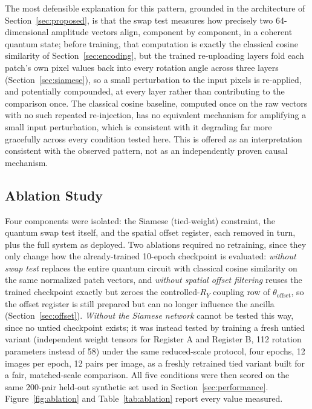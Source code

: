 \documentclass[conference]{IEEEtran}
\begin{document}
The most defensible explanation for this pattern, grounded in the architecture of Section~\ref{sec:proposed}, is that the swap test measures how precisely two 64-dimensional amplitude vectors align, component by component, in a coherent quantum state; before training, that computation is exactly the classical cosine similarity of Section~\ref{sec:encoding}, but the trained re-uploading layers fold each patch's own pixel values back into every rotation angle across three layers (Section~\ref{sec:siamese}), so a small perturbation to the input pixels is re-applied, and potentially compounded, at every layer rather than contributing to the comparison once. The classical cosine baseline, computed once on the raw vectors with no such repeated re-injection, has no equivalent mechanism for amplifying a small input perturbation, which is consistent with it degrading far more gracefully across every condition tested here. This is offered as an interpretation consistent with the observed pattern, not as an independently proven causal mechanism.

\subsection{Ablation Study}\label{sec:ablation}
Four components were isolated: the Siamese (tied-weight) constraint, the quantum swap test itself, and the spatial offset register, each removed in turn, plus the full system as deployed. Two ablations required no retraining, since they only change how the already-trained 10-epoch checkpoint is evaluated: \emph{without swap test} replaces the entire quantum circuit with classical cosine similarity on the same normalized patch vectors, and \emph{without spatial offset filtering} reuses the trained checkpoint exactly but zeroes the controlled-$R_Y$ coupling row of $\theta_{\text{offset}}$, so the offset register is still prepared but can no longer influence the ancilla (Section~\ref{sec:offset}). \emph{Without the Siamese network} cannot be tested this way, since no untied checkpoint exists; it was instead tested by training a fresh untied variant (independent weight tensors for Register A and Register B, 112 rotation parameters instead of 58) under the same reduced-scale protocol, four epochs, 12 images per epoch, 12 pairs per image, as a freshly retrained tied variant built for a fair, matched-scale comparison. All five conditions were then scored on the same 200-pair held-out synthetic set used in Section~\ref{sec:performance}. Figure~\ref{fig:ablation} and Table~\ref{tab:ablation} report every value measured.
\end{document}

